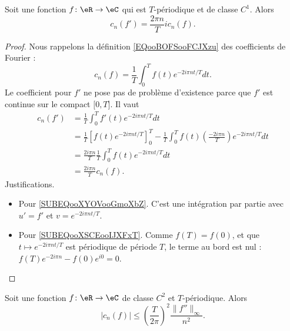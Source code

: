 \begin{lemma}       \label{LEMooPUJDooKRBTaU}
	Soit une fonction \( f\colon \eR\to \eC\) qui est \( T\)-périodique et de classe \( C^1\). Alors
	\begin{equation}
		c_n(f')=\frac{ 2\pi n }{ T }ic_n(f).
	\end{equation}
\end{lemma}

\begin{proof}
	Nous rappelons la définition \eqref{EQooBOFSooFCJXzu} des coefficients de Fourier :
	\begin{equation}
		c_n(f)=\frac{1}{ T }\int_0^Tf(t) e^{-2 i \pi n t/T}dt.
	\end{equation}
	Le coefficient pour \( f'\) ne pose pas de problème d'existence parce que \( f'\) est continue sur le compact \( \mathopen[ 0 , T \mathclose]\). Il vaut
	\begin{subequations}
		\begin{align}
			c_n(f') & =\frac{1}{ T }\int_0^Tf'(t) e^{-2 i \pi n t/T}dt                                                                                                                   \\
			        & =\frac{1}{ T }\left[ f(t) e^{-2i\pi nt/T} \right]_0^T-\frac{1}{ T }\int_0^Tf(t)\left( \frac{ -2i\pi n }{ T } \right) e^{-2i\pi nt/T}dt \label{SUBEQooXYOVooGmoXbZ} \\
			        & =\frac{ 2i\pi n }{ T }\frac{1}{ T }\int_0^Tf(t) e^{-2i\pi nt/T}dt \label{SUBEQooXSCEooIJXFxT}                                                                      \\
			        & =\frac{ 2i\pi n }{ T }c_n(f).
		\end{align}
	\end{subequations}
	Justifications.
	\begin{itemize}
		\item Pour \eqref{SUBEQooXYOVooGmoXbZ}. C'est une intégration par partie avec \( u'=f'\) et \( v= e^{-2i\pi nt/T}\).
		\item Pour \eqref{SUBEQooXSCEooIJXFxT}. Comme \( f(T)=f(0)\), et que \( t\mapsto e^{-2i\pi nt/T}\) est périodique de période \( T\), le terme au bord est nul : \( f(T) e^{-2i\pi n}-f(0) e^{i0}=0\).
	\end{itemize}
\end{proof}

\begin{lemma}     \label{LEMooYJQWooDVvSyj}
	Soit une fonction \( f\colon \eR\to \eC\) de classe \( C^2\) et \( T\)-périodique. Alors
	\begin{equation}
		| c_n(f) |\leq \left( \frac{ T }{ 2\pi } \right)^2 \frac{ \| f'' \|_{\infty} }{ n^2 }.
	\end{equation}
\end{lemma}

